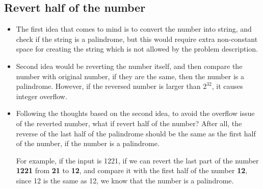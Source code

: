 \subsection{Revert half of the number}
\begin{itemize}
\item The first idea that comes to mind is to convert the number into string, and check if the string is a palindrome, but this would require extra non-constant space for creating the string which is not allowed by the problem description.
\item Second idea would be reverting the number itself, and then compare the number with original number, if they are the same, then the number is a palindrome. However, if the reversed number is larger than $2^{32}$, it causes integer overflow.
\item Following the thoughts based on the second idea, to avoid the overflow issue of the reverted number, what if revert {\color{red}half} of the number? After all, the reverse of the last half of the palindrome should be the same as the first half of the number, if the number is a palindrome.
\par
For example, if the input is 1221, if we can revert the last part of the number \textbf{1221} from {\textbf{\color{blue}21}} to {\textbf{\color{red}12}}, and compare it with the first half of the number \textbf{12}, since 12 is the same as 12, we know that the number is a palindrome.
\end{itemize}
